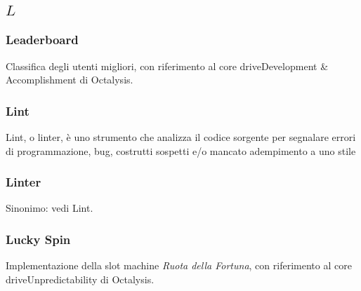 \subsection*{\quad$L\quad$}
\subsubsection*{Leaderboard}
Classifica degli utenti migliori, con riferimento al core drive\glosp Development & Accomplishment di Octalysis\glo.

\subsubsection*{Lint}
Lint, o linter, è uno strumento che analizza il codice sorgente per segnalare errori di programmazione, bug, costrutti sospetti e/o mancato adempimento a uno stile
\subsubsection*{Linter}
Sinonimo: vedi Lint\glo.

\subsubsection*{Lucky Spin}
Implementazione della slot machine \textit{Ruota della Fortuna}, con riferimento al core drive\glosp Unpredictability di Octalysis\glo.